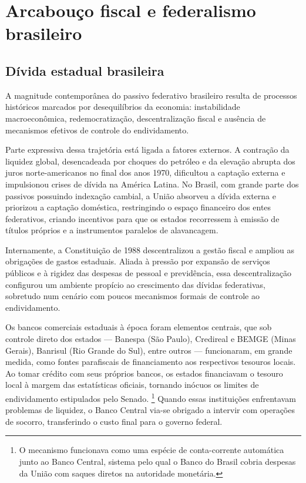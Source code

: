 \chapter{Arcabouço fiscal e federalismo brasileiro}
\label{chap:institucional}
\section{Dívida estadual brasileira}
\label{sec:crise_estadual}

A magnitude contemporânea do passivo federativo brasileiro resulta de processos históricos marcados por desequilíbrios da economia: instabilidade macroeconômica, redemocratização, descentralização fiscal e ausência de mecanismos efetivos de controle do endividamento.

Parte expressiva dessa trajetória está ligada a fatores externos. A contração da liquidez global, desencadeada por choques do petróleo e da elevação abrupta dos juros norte-americanos no final dos anos 1970, dificultou a captação externa e impulsionou crises de dívida na América Latina. No Brasil, com grande parte dos passivos possuindo indexação cambial, a União absorveu a dívida externa e priorizou a captação doméstica, restringindo o espaço financeiro dos entes federativos, criando incentivos para que os estados recorressem à emissão de títulos próprios e a instrumentos paralelos de alavancagem.

Internamente, a Constituição de 1988 descentralizou a gestão fiscal e ampliou as obrigações de gastos estaduais. Aliada à pressão por expansão de serviços públicos e à rigidez das despesas de pessoal e previdência, essa descentralização configurou um ambiente propício ao crescimento das dívidas federativas, sobretudo num cenário com poucos mecanismos formais de controle ao endividamento.

Os bancos comerciais estaduais à época foram elementos centrais, que sob controle direto dos estados --- Banespa (São Paulo), Credireal e BEMGE (Minas Gerais), Banrisul (Rio Grande do Sul), entre outros --- funcionaram, em grande medida, como fontes parafiscais de financiamento aos respectivos tesouros locais. Ao tomar crédito com seus próprios bancos, os estados financiavam o tesouro local à margem das estatísticas oficiais, tornando inócuos os limites de endividamento estipulados pelo Senado. \footnote{O mecanismo funcionava como uma espécie de conta-corrente automática junto ao Banco Central, sistema pelo qual o Banco do Brasil cobria despesas da União com saques diretos na autoridade monetária.} Quando essas instituições enfrentavam problemas de liquidez, o Banco Central via-se obrigado a intervir com operações de socorro, transferindo o custo final para o governo federal.

